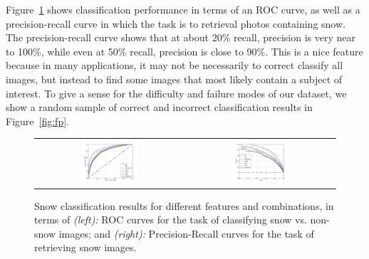 \documentclass[10pt,journal,compsoc]{IEEEtran}
\begin{document}
Figure~\ref{fig:PR_ROC_snow} shows classification performance in
terms of an ROC curve, as well as a
precision-recall curve in which the task is to retrieval photos
containing snow. The precision-recall curve shows that at about 20\%
recall, precision is very near to 100\%, while even at 50\% recall,
precision is close to 90\%.  This is a nice feature because in many
applications, it may not be necessarily to correct classify all
images, but instead to find some images that most likely contain a
subject of interest.
%
To give a sense for the difficulty and failure modes of our dataset,
we show a random sample of correct and incorrect classification results
in Figure~\ref{fig:fp}.

\begin{figure}[th!]
\begin{center}
\vspace{-16pt}
\begin{tabular}{cc}
 \includegraphics[width=0.4\textwidth]{figs/ROC-curves.jpg} &
\includegraphics[width=0.4\textwidth]{figs/PR-curves.jpg} \\
\end{tabular}
\end{center}
\vspace{-8pt}
\caption{
Snow classification results for different features and combinations, in terms of {\textit{(left):}} ROC curves for the task of classifying snow vs. non-snow images; and 
{\textit{(right):}} Precision-Recall curves for the task of retrieving snow images.
}
\label{fig:PR_ROC_snow}
\end{figure}
\end{document}
